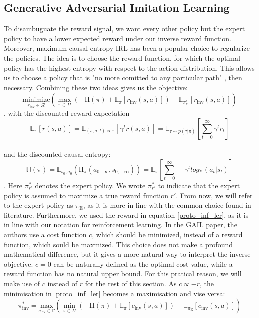 \subsection{Generative Adversarial Imitation Learning}
To disambuguate the reward signal, we want every other policy but the expert policy to have a lower expected reward under our inverse reward function. Moreover, 
maximum causal entropy IRL \cite{max_cause_ent_IRL} has been a popular choice to regularize the policies. The idea is to choose the reward function, for 
which the optimal policy has the highest entropy with respect to the action distribution. This allows us to choose a policy that is "no more comitted to any 
particular path" \cite[p.2]{max_cause_ent_IRL}, then necessary. Combining these two ideas gives us the objective:
\begin{equation}
    \label{proto_inf_ler}
    \underset{r_{\text{inv}} \in \mathcal{R}}{\text{minimize}} \left( \max_{\pi \in \Pi} \left( - \text{H}(\pi) + \mathbb{E}_{\pi}[r_{\text{inv}}(s, a)] \right) - \mathbb{E}_{\pi_{r'}^*}[r_{\text{inv}}(s,a)] \right)
\end{equation}
, with the discounted reward expectation
\begin{equation*}
    \mathbb{E}_{\pi}[r(s, a)] =
    \mathbb{E}_{(s,a,t) \propto \pi}[\gamma^t r(s,a)] = 
    \mathbb{E}_{\tau \sim p(\tau | \pi)} \left[ \sum_{t=0}^\infty \gamma^t r_t \right]
\end{equation*}
\\
and the discounted causal entropy:
\begin{equation*}
    \mathbb{H}(\pi) = \mathbb{E}_{s_0, a_0} \left(\text{H}_{\pi}(a_{0...\infty}, s_{0,...\infty})\right) = \mathbb{E}_{\pi}\left[\sum_{t=0}^\infty -\gamma^t log \pi(a_t|s_t)\right]
\end{equation*}
\cite{InfCausalEnt}. Here $\pi_{r'}^*$ denotes the expert policy. We wrote $\pi_{r'}^*$ to indicate that the expert policy is assumed to maximize a true 
reward function ${r'}$. From now, we will refer to the expert policy as $\pi_{\text{E}}$, as it is more in line with the common choice found in 
literature. Furthermore, we used the reward in equation  \ref{proto_inf_ler}, as it is in line with our notation for reinforcement learning. In the GAIL paper, 
the authors use a cost function $c$, which should be minimized, instead of a reward function, which sould be maxmized. This choice does not make a profound 
mathematical difference, but it gives a more natural way to interpret the inverse objective. $c=0$ can be naturally defined as the optimal cost value, while a reward function has 
no natural upper bound. For this pratical reason, we will make use of $c$ instead of $r$ for the rest of this section. As $c \propto -r$, the minimisation in 
\ref{proto_inf_ler} becomes a maximisation and vise versa:
\begin{equation}
    \label{proto_inf_ler_c}
    \pi_{\text{inv}}^* = \underset{c_{\text{inv}} \in \mathcal{C}}{\text{max}} \left( \min_{\pi \in \Pi} \left(- \text{H}(\pi) + \mathbb{E}_{\pi}[c_{\text{inv}}(s, a)] \right) - \mathbb{E}_{\pi_{\text{E}}}[c_{\text{inv}}(s,a)] \right)
\end{equation}

